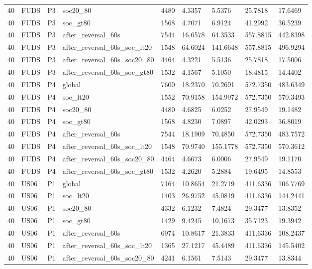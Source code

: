 \begin{tabular}{lllllllll}
40 & FUDS & P3 & soc20\_80 & 4480 & 4.3357 & 5.5376 & 25.7818 & 17.6469 \\
40 & FUDS & P3 & soc\_gt80 & 1568 & 4.7071 & 6.9124 & 41.2992 & 36.5239 \\
40 & FUDS & P3 & after\_reversal\_60s & 7544 & 16.6578 & 64.3533 & 557.8815 & 442.8398 \\
40 & FUDS & P3 & after\_reversal\_60s\_soc\_lt20 & 1548 & 64.6024 & 141.6648 & 557.8815 & 496.9294 \\
40 & FUDS & P3 & after\_reversal\_60s\_soc20\_80 & 4464 & 4.3221 & 5.5136 & 25.7818 & 17.5006 \\
40 & FUDS & P3 & after\_reversal\_60s\_soc\_gt80 & 1532 & 4.1567 & 5.1050 & 18.4815 & 14.4402 \\
40 & FUDS & P4 & global & 7600 & 18.2370 & 70.2691 & 572.7350 & 483.6349 \\
40 & FUDS & P4 & soc\_lt20 & 1552 & 70.9158 & 154.9972 & 572.7350 & 570.3493 \\
40 & FUDS & P4 & soc20\_80 & 4480 & 4.6825 & 6.0252 & 27.9549 & 19.1482 \\
40 & FUDS & P4 & soc\_gt80 & 1568 & 4.8230 & 7.0897 & 42.0293 & 36.8019 \\
40 & FUDS & P4 & after\_reversal\_60s & 7544 & 18.1909 & 70.4850 & 572.7350 & 483.7572 \\
40 & FUDS & P4 & after\_reversal\_60s\_soc\_lt20 & 1548 & 70.9740 & 155.1778 & 572.7350 & 570.3612 \\
40 & FUDS & P4 & after\_reversal\_60s\_soc20\_80 & 4464 & 4.6673 & 6.0006 & 27.9549 & 19.1170 \\
40 & FUDS & P4 & after\_reversal\_60s\_soc\_gt80 & 1532 & 4.2620 & 5.2884 & 19.6495 & 14.8553 \\
40 & US06 & P1 & global & 7164 & 10.8654 & 21.2719 & 411.6336 & 106.7769 \\
40 & US06 & P1 & soc\_lt20 & 1403 & 26.9752 & 45.0819 & 411.6336 & 144.2441 \\
40 & US06 & P1 & soc20\_80 & 4332 & 6.1232 & 7.4824 & 29.3477 & 13.8352 \\
40 & US06 & P1 & soc\_gt80 & 1429 & 9.4245 & 10.1673 & 35.7123 & 19.3942 \\
40 & US06 & P1 & after\_reversal\_60s & 6974 & 10.8617 & 21.3833 & 411.6336 & 108.2437 \\
40 & US06 & P1 & after\_reversal\_60s\_soc\_lt20 & 1365 & 27.1217 & 45.4489 & 411.6336 & 145.5402 \\
40 & US06 & P1 & after\_reversal\_60s\_soc20\_80 & 4241 & 6.1561 & 7.5143 & 29.3477 & 13.8344 \\

\end{tabular}
